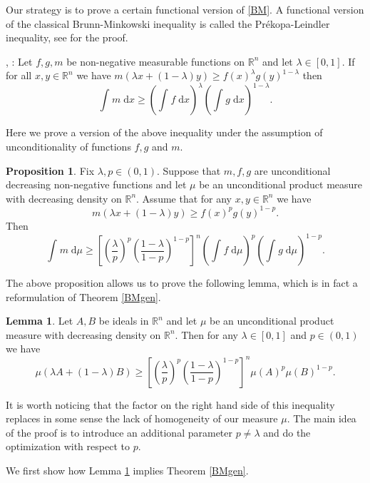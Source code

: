 \documentclass[11pt]{article}
\newcommand{\call}[4]{\int_{#1}^{#2} {#3} \; \textrm{d} {#4}}
\newcommand{\mb}[1]{\mathbb{{#1}}}
\newcommand{\1}{\mathbf{{1}}}
\theoremstyle{definition}
\newtheorem{prop}{Proposition}
\newtheorem{lem}{Lemma}
\begin{document}
Our strategy is to prove a certain functional version of \eqref{BM}. A functional version of the classical Brunn-Minkowski inequality is called the Pr\'ekopa-Leindler inequality, see \cite{G1} for the proof.

\vspace{0.3cm}
 \cite{P}, \cite{Le}:
Let $f,g,m$ be non-negative measurable functions on $\mb{R}^n$ and let $\lambda \in [0,1]$. If for all $x,y \in \mb{R}^n$ we have $m(\lambda x + (1-\lambda )y) \geq f(x)^\lambda g(y)^{1-\lambda}$ then
\[
	\call{}{}{m}{x} \geq \left( \call{}{}{f}{x} \right)^\lambda \left( \call{}{}{g}{x} \right)^{1-\lambda}.
\]

\noindent Here we prove a version of the above inequality under the assumption of unconditionality of functions $f,g$ and $m$.

\begin{prop}\label{PL}
Fix $\lambda,p \in (0,1)$. Suppose that $m,f,g$ are unconditional decreasing non-negative functions and let $\mu$ be an unconditional product measure with decreasing density on $\mb{R}^n$. Assume that for any $x,y \in \mb{R}^n$ we have
\[
	m(\lambda x + (1-\lambda)y) \geq f(x)^p g(y)^{1-p}.
\]
Then
\[
	\call{}{}{m}{\mu} \geq  \left[\left( \frac{\lambda}{p} \right)^{p}  \left( \frac{1-\lambda}{1-p} \right)^{1-p} \right]^n \left( \call{}{}{f}{\mu} \right)^p \left( \call{}{}{g}{\mu} \right)^{1-p}.
\]
\end{prop}
\noindent The above proposition  allows us to prove the following lemma, which is in fact a reformulation of Theorem \ref{BMgen}.

\begin{lem}\label{main}
Let $A,B$ be ideals in $\mb{R}^n$ and let $\mu$ be an unconditional product measure with decreasing density on $\mb{R}^n$. Then for any $\lambda \in [0,1]$ and $p \in (0,1)$ we have
\[
	\mu(\lambda A + (1-\lambda) B) \geq \left[\left( \frac{\lambda}{p} \right)^{p}  \left( \frac{1-\lambda}{1-p} \right)^{1-p} \right]^n \mu(A)^{p} \mu(B)^{1-p}.
\]
\end{lem}
It is worth noticing that the factor on the right hand side of this inequality replaces in some sense the lack of homogeneity of our measure $\mu$. The main idea of the proof is to introduce an additional parameter $p \ne \lambda$ and do the optimization with respect to $p$.

We first show how Lemma \ref{main} implies Theorem \ref{BMgen}.
\end{document}
